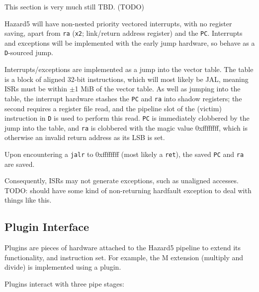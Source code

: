 \documentclass[notitlepage]{article}
\begin{document}
This section is very much still TBD. (TODO)

Hazard5 will have non-nested priority vectored interrupts, with no register saving, apart from {\tt ra} ({\tt x2}; link/return address register) and the {\tt PC}. Interrupts and exceptions will be implemented with the early jump hardware, so behave as a {\tt D}-sourced jump.

Interrupts/exceptions are implemented as a jump into the vector table. The table is a block of aligned 32-bit instructions, which will most likely be JAL, meaning ISRs must be within $\pm$1 MiB of the vector table. As well as jumping into the table, the interrupt hardware stashes the {\tt PC} and {\tt ra} into shadow registers; the second requires a register file read, and the pipeline slot of the (victim) instruction in {\tt D} is used to perform this read. {\tt PC} is immediately clobbered by the jump into the table, and {\tt ra} is clobbered with the magic value 0xffffffff, which is otherwise an invalid return address as its LSB is set.

Upon encountering a {\tt jalr} to 0xffffffff (most likely a {\tt ret}), the saved {\tt PC} and {\tt ra} are saved.

Consequently, ISRs may not generate exceptions, such as unaligned accesses. TODO: should have some kind of non-returning hardfault exception to deal with things like this.

\subsection{Plugin Interface}

Plugins are pieces of hardware attached to the Hazard5 pipeline to extend its functionality, and instruction set. For example, the M extension (multiply and divide) is implemented using a plugin.

Plugins interact with three pipe stages:
\end{document}
